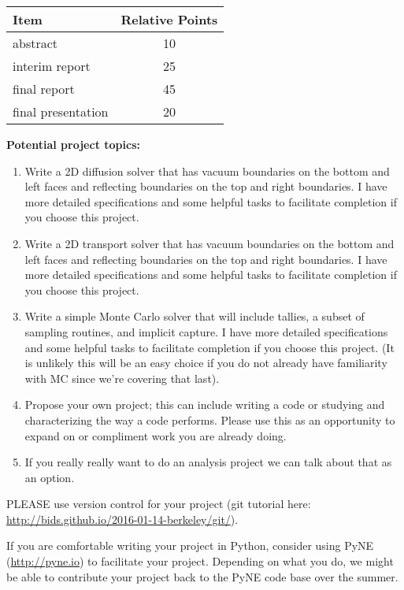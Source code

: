 \documentclass[12pt]{article}
\begin{document}
\begin{center}
\begin{tabu}{| l | c |}\hline
\textbf{Item} & \textbf{Relative Points} \\ \hline \hline
abstract & 10 \\
interim report & 25 \\
final report & 45 \\
final presentation & 20 \\ \hline
\end{tabu} 
\end{center}

\clearpage 
\begin{center}
\textbf{Potential project topics:}
\end{center}

\begin{enumerate}
\item Write a 2D diffusion solver that has vacuum boundaries on the bottom and left faces and reflecting boundaries on the top and right boundaries. I have more detailed specifications and some helpful tasks to facilitate completion if you choose this project. 

\item Write a 2D transport solver that has vacuum boundaries on the bottom and left faces and reflecting boundaries on the top and right boundaries. I have more detailed specifications and some helpful tasks to facilitate completion if you choose this project.

\item Write a simple Monte Carlo solver that will include tallies, a subset of sampling routines, and implicit capture. I have more detailed specifications and some helpful tasks to facilitate completion if you choose this project. (It is unlikely this will be an easy choice if you do not already have familiarity with MC since we're covering that last).

\item Propose your own project; this can include writing a code or studying and characterizing the way a code performs. Please use this as an opportunity to expand on or compliment work you are already doing.

\item If you really really want to do an analysis project we can talk about that as an option.
\end{enumerate}

\vspace*{1 em}
PLEASE use version control for your project (git tutorial here: \url{http://bids.github.io/2016-01-14-berkeley/git/}). 

\vspace*{1 em}
If you are comfortable writing your project in Python, consider using PyNE (\url{http://pyne.io}) to facilitate your project. Depending on what you do, we might be able to contribute your project back to the PyNE code base over the summer.
\end{document}
